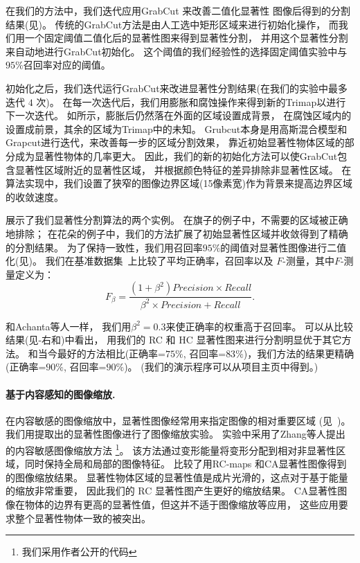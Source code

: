 \documentclass[final]{cvpr}
\newcommand{\CA}{CA\cite{10cvpr/goferman_context}}
\newcommand{\RC}{RC-maps }
\newcommand{\mypara}[1]{\paragraph{#1.}}
\begin{document}
在我们的方法中，我们迭代应用GrabCut \cite{04tog/rother_grabcut} 来改善二值化显著性
图像后得到的分割结果(见)。
传统的GrabCut方法是由人工选中矩形区域来进行初始化操作，
而我们用一个固定阈值二值化后的显著性图来得到显著性分割，
并用这个显著性分割来自动地进行GrabCut初始化。
这个阈值的我们经验性的选择固定阈值实验中与$95\%$召回率对应的阈值。


初始化之后，我们迭代运行GrabCut来改进显著性分割结果(在我们的实验中最多迭代 $4$ 次)。
在每一次迭代后，我们用膨胀和腐蚀操作来得到新的Trimap以进行下一次迭代。
如所示，膨胀后仍然落在外面的区域设置成背景，
在腐蚀区域内的设置成前景，其余的区域为Trimap中的未知。
Grubcut本身是用高斯混合模型和Grapcut进行迭代，来改善每一步的区域分割效果，
靠近初始显著性物体区域的部分成为显著性物体的几率更大。
因此，我们的新的初始化方法可以使GrabCut包含显著性区域附近的显著性区域，
并根据颜色特征的差异排除非显著性区域。
在算法实现中，我们设置了狭窄的图像边界区域(15像素宽)作为背景来提高边界区域的收敛速度。


展示了我们显著性分割算法的两个实例。
在旗子的例子中，不需要的区域被正确地排除；
在花朵的例子中，我们的方法扩展了初始显著性区域并收敛得到了精确的分割结果。
为了保持一致性，我们用召回率$95\%$的阈值对显著性图像进行二值化(见)。
我们在基准数据集~\cite{09cvpr/Achanta_FTSaliency}上比较了平均正确率，召回率以及
$F$-测量，其中$F$-测量定义为：
\begin{equation}\label{equ:FMeasure}
    F_{\beta}= \frac{(1+\beta^2)Precision \times
        Recall}{\beta^2 \times Precision + Recall}.
\end{equation}

和Achanta等人\cite{09cvpr/Achanta_FTSaliency}一样，
我们用$\beta^2=0.3$来使正确率的权重高于召回率。
可以从比较结果(见-右和)中看出，
用我们的 RC 和 HC 显著性图来进行分割明显优于其它方法。
和当今最好的方法相比(正确率=$75\%$, 召回率=$83\%$)，我们方法的结果更精确
(正确率=$90\%$, 召回率=$90\%$)。
(我们的演示程序可以从项目主页中得到。)





\mypara{基于内容感知的图像缩放}
在内容敏感的图像缩放中，显著性图像经常用来指定图像的相对重要区域
(见~\cite{09_image_resize})。
我们用提取出的显著性图像进行了图像缩放实验。
实验中采用了Zhang等人提出的\cite{09cgf/ZhangC}内容敏感图像缩放方法
\footnote{我们采用作者公开的代码}。
该方法通过变形能量将变形分配到相对非显著性区域，同时保持全局和局部的图像特征。
比较了用\RC 和\CA 显著性图像得到的图像缩放结果。
显著性物体区域的显著性值是成片光滑的，这点对于基于能量的缩放非常重要，
因此我们的 RC 显著性图产生更好的缩放结果。
CA显著性图像在物体的边界有更高的显著性值，但这并不适于图像缩放等应用，
这些应用要求整个显著性物体一致的被突出。
\end{document}
